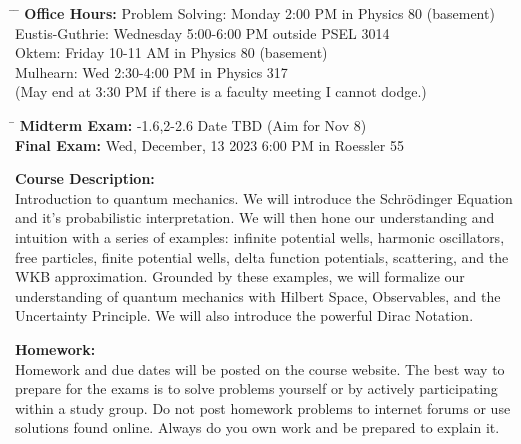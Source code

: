 \documentclass[12pt]{article}
\begin{document}
\begin{tabbing}
\hspace*{8em}\= \hspace*{10em} \= \kill 
\textbf{Office Hours:} \> Problem Solving: \> Monday 2:00 PM in Physics 80 (basement)\\
    \> Eustis-Guthrie: \> Wednesday 5:00-6:00 PM outside PSEL 3014 \\
    \> Oktem: \> Friday 10-11 AM in Physics 80 (basement) \\
    \> Mulhearn: \> Wed 2:30-4:00 PM in Physics 317\\
    \> (May end at 3:30 PM if there is a faculty meeting I cannot dodge.)\\
\end{tabbing}

\noindent
\begin{tabbing}
\hspace*{12em}\= \kill 
\textbf{Midterm Exam:} -1.6,2-2.6 Date TBD (Aim for Nov 8)\\
\textbf{Final Exam:} \> Wed, December, 13 2023 6:00 PM in Roessler 55
\end{tabbing}
\noindent
\textbf {Course Description:}\\
Introduction to quantum mechanics.  We will introduce the
Schr\"odinger Equation and it's probabilistic interpretation.  We will
then hone our understanding and intuition with a series of examples:
infinite potential wells, harmonic oscillators, free particles, finite
potential wells, delta function potentials, scattering, and the WKB
approximation.  Grounded by these examples, we will formalize our
understanding of quantum mechanics with Hilbert Space, Observables,
and the Uncertainty Principle.  We will also introduce the powerful
Dirac Notation.\\

\newpage
\noindent

\noindent
\textbf{Homework:}\\
Homework and due dates will be posted on the course website.  The best way to prepare for the exams is to solve problems yourself or by actively participating within a study group.  Do not post homework problems to internet forums or use solutions found online.  Always do you own work and be prepared to explain it.\\
\end{document}
